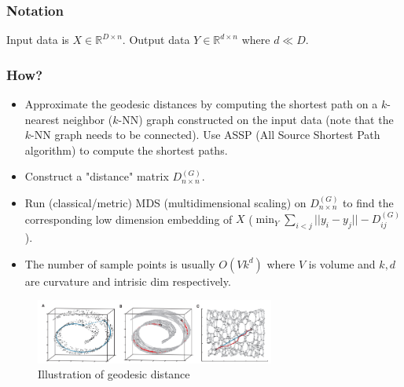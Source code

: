\subsubsection*{Notation}
Input data is $X \in \mathbb{R}^{D\times n}$. Output data $Y \in
\mathbb{R}^{d\times n}$ where $d\ll D$. 

\subsubsection*{How?}
\begin{itemize}
\item Approximate the geodesic distances by computing the shortest
  path on a $k$-nearest neighbor ($k$-NN) graph constructed on the input data
  (note that the $k$-NN graph needs to be connected). Use ASSP (All Source Shortest Path algorithm) to compute the shortest paths.
\item Construct a "distance" matrix $D^{(G)}_{n\times n}$.
\item Run (classical/metric) MDS (multidimensional scaling) on $D^{(G)}_{n\times n}$ to find
  the corresponding low dimension embedding of $X$ ($\min_{Y} \sum_{i<j}||y_i - y_j|| -
  D^{(G)}_{ij}$). 
  
 \item The number of sample points is usually $O(Vk^d)$ where $V$ is volume and $k,d$ are curvature and intrisic dim respectively. 
\end{itemize}

\begin{figure}
\centering
\includegraphics[width=0.7\textwidth]{chapter_7/files/isomap.png}
\caption{Illustration of geodesic distance}
\end{figure}



